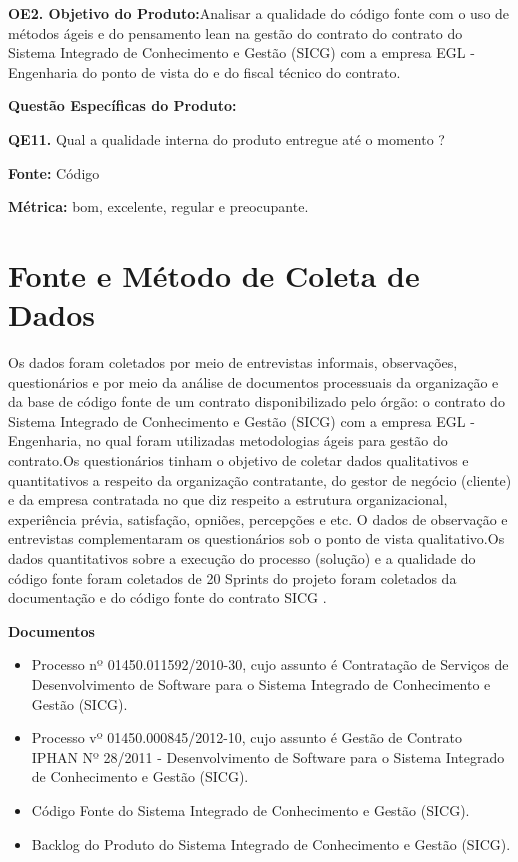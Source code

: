 \textbf{OE2. Objetivo do Produto:}Analisar a qualidade do código fonte com o uso de métodos ágeis e do pensamento lean na gestão do contrato do contrato do Sistema Integrado 
de Conhecimento e Gestão (SICG) com a empresa EGL - Engenharia do ponto de vista do  e do fiscal técnico do contrato.

\textbf{Questão Específicas do Produto:}

\textbf{QE11.} Qual a qualidade interna do produto entregue até o momento ?

\textbf{Fonte:} Código

\textbf{Métrica:} bom, excelente, regular e preocupante.


\section[Fonte e Método Coleta de Dados]{Fonte e Método de Coleta de Dados}

Os dados foram coletados por meio de entrevistas informais, observações, questionários e por meio da análise de documentos processuais da organização e da base de código fonte de um contrato disponibilizado pelo órgão: o contrato do Sistema Integrado de Conhecimento e Gestão (SICG) com a empresa EGL - Engenharia, no qual foram utilizadas metodologias ágeis para gestão do contrato.Os questionários tinham o objetivo de coletar dados qualitativos e
quantitativos a respeito da organização contratante, do gestor de negócio (cliente) e da empresa contratada no que diz respeito a estrutura organizacional, experiência prévia, satisfação, opniões, percepções e etc. O dados de observação e entrevistas
complementaram os questionários sob o ponto de vista qualitativo.Os dados quantitativos
sobre a execução do processo (solução) e a qualidade do código fonte foram coletados de 20 Sprints do projeto foram coletados da documentação e do código fonte do contrato SICG .

\textbf{Documentos}
\begin{itemize}
\item Processo nº 01450.011592/2010-30, cujo assunto é Contratação de Serviços de Desenvolvimento de Software para o Sistema Integrado de Conhecimento e Gestão (SICG). 
\item Processo vº 01450.000845/2012-10, cujo assunto é Gestão de Contrato IPHAN Nº 28/2011 - Desenvolvimento de Software para o Sistema Integrado de Conhecimento e Gestão (SICG). 
\item Código Fonte do Sistema Integrado de Conhecimento e Gestão (SICG).
\item Backlog do Produto do Sistema Integrado de Conhecimento e Gestão (SICG).
\end{itemize}

